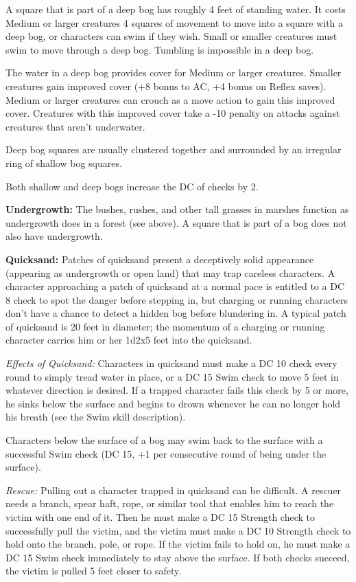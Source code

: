A square that is part of a deep bog has roughly 4 feet of standing water. It costs 
Medium or larger creatures 4 squares of movement to move into a square with a deep 
bog, or characters can swim if they wish. Small or smaller creatures must swim 
to move through a deep bog. Tumbling is impossible in a deep bog.

The water in a deep bog provides cover for Medium or larger creatures. Smaller 
creatures gain improved cover (+8 bonus to AC, +4 bonus on Reflex saves). Medium 
or larger creatures can crouch as a move action to gain this improved cover. Creatures 
with this improved cover take a -10 penalty on attacks against creatures that aren't 
underwater.

Deep bog squares are usually clustered together and surrounded by an irregular 
ring of shallow bog squares.

Both shallow and deep bogs increase the DC of  checks by 2.

\textbf{Undergrowth:} The bushes, rushes, and other tall grasses in marshes function 
as undergrowth does in a forest (see above). A square that is part of a bog does 
not also have undergrowth. 

\textbf{Quicksand:} Patches of quicksand present a deceptively solid appearance 
(appearing as undergrowth or open land) that may trap careless characters. A character 
approaching a patch of quicksand at a normal pace is entitled to a DC 8  
check to spot the danger before stepping in, but charging or running characters 
don't have a chance to detect a hidden bog before blundering in. A typical patch 
of quicksand is 20 feet in diameter; the momentum of a charging or running character 
carries him or her 1d2x5 feet into the quicksand.

\textit{Effects of Quicksand:} Characters in quicksand must make a DC 10  check 
every round to simply tread water in place, or a DC 15 Swim check to move 5 feet 
in whatever direction is desired. If a trapped character fails this check by 5 
or more, he sinks below the surface and begins to drown whenever he can no longer 
hold his breath (see the Swim skill description).

Characters below the surface of a bog may swim back to the surface with a successful 
Swim check (DC 15, +1 per consecutive round of being under the surface).

\textit{Rescue:} Pulling out a character trapped in quicksand can be difficult. 
A rescuer needs a branch, spear haft, rope, or similar tool that enables him to 
reach the victim with one end of it. Then he must make a DC 15 Strength check to 
successfully pull the victim, and the victim must make a DC 10 Strength check to 
hold onto the branch, pole, or rope. If the victim fails to hold on, he must make 
a DC 15 Swim check immediately to stay above the surface. If both checks succeed, 
the victim is pulled 5 feet closer to safety.

